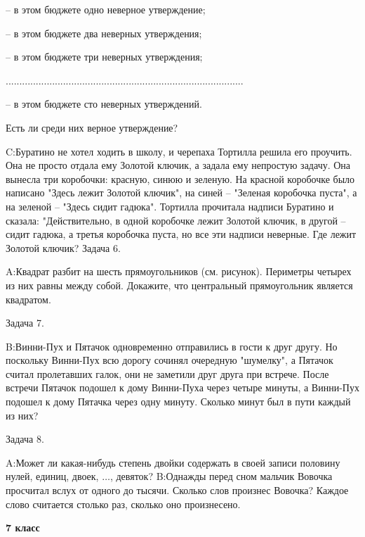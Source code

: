 \documentclass[11pt,a4paper,book]{ncc} \usepackage{modules/nonstahp_book}
\begin{document}
-- в этом бюджете одно неверное утверждение;

-- в этом бюджете два неверных утверждения;

-- в этом бюджете три неверных утверждения;

.......................................................................................

-- в этом бюджете сто неверных утверждений.

Есть ли среди них верное утверждение?
\medbreak\noindent

\medbreak\noindent
C:\qquad Буратино не хотел ходить в школу, и черепаха Тортилла решила его проучить. Она не просто отдала ему Золотой ключик, а задала ему непростую задачу. Она вынесла три коробочки: красную, синюю и зеленую. На красной коробочке было написано "Здесь лежит Золотой ключик", на синей -- "Зеленая коробочка пуста", а на зеленой -- "Здесь сидит гадюка". Тортилла прочитала надписи Буратино и сказала: "Действительно, в одной коробочке лежит Золотой ключик, в другой -- сидит гадюка, а третья коробочка пуста, но все эти надписи неверные. Где лежит Золотой ключик?\bigbreak\noindent
Задача 6.\par\noindent
A:\qquad Квадрат разбит на шесть прямоугольников (см. рисунок). Периметры четырех из них равны между собой. Докажите, что центральный прямоугольник является квадратом.\medbreak\noindent

\bigbreak\noindent
Задача 7.\par\noindent

\medbreak\noindent
B:\qquad Винни-Пух и Пятачок одновременно отправились в гости к друг другу. Но поскольку Винни-Пух всю дорогу сочинял очередную "шумелку", а Пятачок считал пролетавших галок, они не заметили друг друга при встрече. После встречи Пятачок подошел к дому Винни-Пуха через четыре минуты, а Винни-Пух подошел к дому Пятачка через одну минуту. Сколько минут был в пути каждый из них?
\medbreak\noindent

\bigbreak\noindent
Задача 8.\par\noindent
A:\qquad Может ли какая-нибудь степень двойки содержать в своей записи половину нулей, единиц, двоек, $\ldots$, девяток?\medbreak\noindent
B:\qquad Однажды перед сном мальчик Вовочка просчитал вслух от одного до тысячи. Сколько слов произнес Вовочка? Каждое слово считается столько раз, сколько оно произнесено.\medbreak\noindent


\vfill\eject

\medbreak\centerline{\bfseries 7 класс}\bigbreak\noindent
\end{document}
